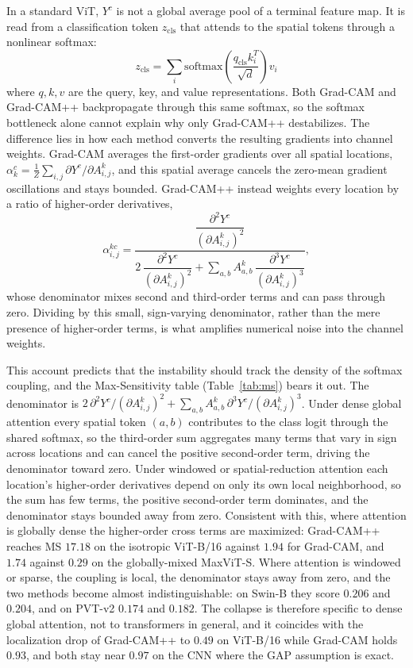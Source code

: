\documentclass[final,5p,times,twocolumn]{elsarticle}
\begin{document}
In a standard ViT, $Y^c$ is not a global average pool of a terminal feature map. It is read from a classification token $z_{\text{cls}}$ that attends to the spatial tokens through a nonlinear softmax:
\begin{equation}
z_{\text{cls}} = \sum_i \text{softmax}\!\left(\frac{q_{\text{cls}} k_i^T}{\sqrt{d}}\right) v_i
\end{equation}
where $q, k, v$ are the query, key, and value representations. Both Grad-CAM and Grad-CAM++ backpropagate through this same softmax, so the softmax bottleneck alone cannot explain why only Grad-CAM++ destabilizes. The difference lies in how each method converts the resulting gradients into channel weights. Grad-CAM averages the first-order gradients over all spatial locations, $\alpha_k^c = \tfrac{1}{Z}\sum_{i,j} \partial Y^c / \partial A^k_{i,j}$, and this spatial average cancels the zero-mean gradient oscillations and stays bounded. Grad-CAM++ instead weights every location by a ratio of higher-order derivatives,
\begin{equation}
\alpha_{i,j}^{kc} = \frac{\dfrac{\partial^2 Y^c}{(\partial A^k_{i,j})^2}}{2\,\dfrac{\partial^2 Y^c}{(\partial A^k_{i,j})^2} + \displaystyle\sum_{a,b} A^k_{a,b}\,\dfrac{\partial^3 Y^c}{(\partial A^k_{i,j})^3}},
\end{equation}
whose denominator mixes second and third-order terms and can pass through zero. Dividing by this small, sign-varying denominator, rather than the mere presence of higher-order terms, is what amplifies numerical noise into the channel weights.

This account predicts that the instability should track the density of the softmax coupling, and the Max-Sensitivity table (Table~\ref{tab:ms}) bears it out. The denominator is $2\,\partial^2 Y^c/(\partial A^k_{i,j})^2 + \sum_{a,b} A^k_{a,b}\,\partial^3 Y^c/(\partial A^k_{i,j})^3$. Under dense global attention every spatial token $(a,b)$ contributes to the class logit through the shared softmax, so the third-order sum aggregates many terms that vary in sign across locations and can cancel the positive second-order term, driving the denominator toward zero. Under windowed or spatial-reduction attention each location's higher-order derivatives depend on only its own local neighborhood, so the sum has few terms, the positive second-order term dominates, and the denominator stays bounded away from zero. Consistent with this, where attention is globally dense the higher-order cross terms are maximized: Grad-CAM++ reaches MS $17.18$ on the isotropic ViT-B/16 against $1.94$ for Grad-CAM, and $1.74$ against $0.29$ on the globally-mixed MaxViT-S. Where attention is windowed or sparse, the coupling is local, the denominator stays away from zero, and the two methods become almost indistinguishable: on Swin-B they score $0.206$ and $0.204$, and on PVT-v2 $0.174$ and $0.182$. The collapse is therefore specific to dense global attention, not to transformers in general, and it coincides with the localization drop of Grad-CAM++ to $0.49$ on ViT-B/16 while Grad-CAM holds $0.93$, and both stay near $0.97$ on the CNN where the GAP assumption is exact.
\end{document}
